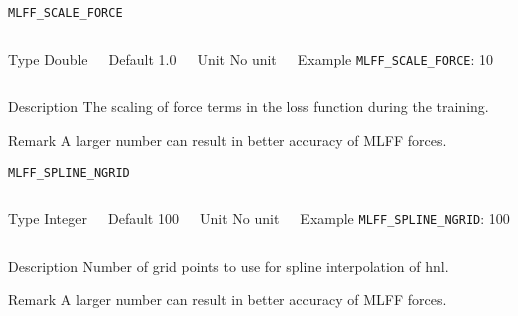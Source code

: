 \begin{frame}[allowframebreaks]{\texttt{{MLFF\_SCALE\_FORCE}}} \label{MLFF_SCALE_FORCE}
\vspace*{-12pt}
\begin{columns}
\begin{block}{Type}
Double
\end{block}

\begin{block}{Default}
1.0
\end{block}

\begin{block}{Unit}
No unit
\end{block}

\begin{block}{Example}
\texttt{MLFF\_SCALE\_FORCE}: 10
\end{block}
\end{columns}

\begin{block}{Description}
 The scaling of force terms in the loss function during the training.
\end{block}

\begin{block}{Remark}
A larger number can result in better accuracy of MLFF forces.
\end{block}
\end{frame}

\begin{frame}[allowframebreaks]{\texttt{{MLFF\_SPLINE\_NGRID}}} \label{MLFF_SPLINE_NGRID}
\vspace*{-12pt}
\begin{columns}
\begin{block}{Type}
Integer
\end{block}

\begin{block}{Default}
100
\end{block}

\begin{block}{Unit}
No unit
\end{block}

\begin{block}{Example}
\texttt{MLFF\_SPLINE\_NGRID}: 100
\end{block}
\end{columns}

\begin{block}{Description}
 Number of grid points to use for spline interpolation of hnl.
\end{block}

\begin{block}{Remark}
A larger number can result in better accuracy of MLFF forces.
\end{block}
\end{frame}

